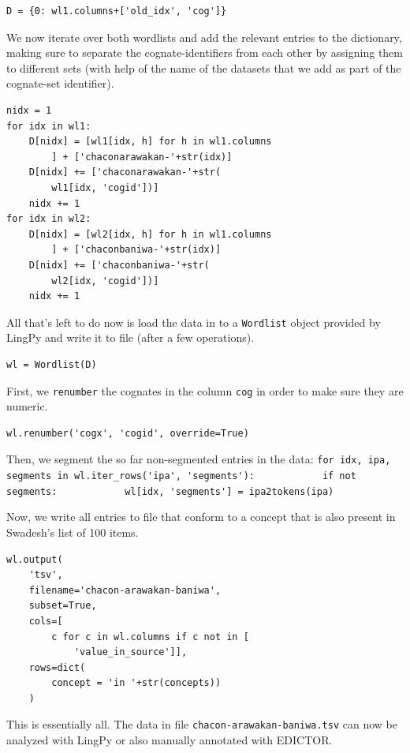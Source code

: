\documentclass[
  a4paper,
  14pt,
  oneside,
  tablecaptionabove
]{scrbook}
\begin{document}
\begin{lstlisting}
D = {0: wl1.columns+['old_idx', 'cog']}
\end{lstlisting}

We now iterate over both wordlists and add the relevant entries to the
dictionary, making sure to separate the cognate-identifiers from each
other by assigning them to different sets (with help of the name of the
datasets that we add as part of the cognate-set identifier).

\begin{lstlisting}
nidx = 1
for idx in wl1:
    D[nidx] = [wl1[idx, h] for h in wl1.columns
        ] + ['chaconarawakan-'+str(idx)]
    D[nidx] += ['chaconarawakan-'+str(
        wl1[idx, 'cogid'])]
    nidx += 1
for idx in wl2:
    D[nidx] = [wl2[idx, h] for h in wl1.columns
        ] + ['chaconbaniwa-'+str(idx)]
    D[nidx] += ['chaconbaniwa-'+str(
        wl2[idx, 'cogid'])]
    nidx += 1
\end{lstlisting}

All that's left to do now is load the data in to a \lstinline!Wordlist!
object provided by LingPy and write it to file (after a few operations).

\begin{lstlisting}
wl = Wordlist(D)
\end{lstlisting}

First, we \lstinline!renumber! the cognates in the column
\lstinline!cog! in order to make sure they are numeric.

\begin{lstlisting}
wl.renumber('cogx', 'cogid', override=True)
\end{lstlisting}

Then, we segment the so far non-segmented entries in the data:
\lstinline!for idx, ipa, segments in wl.iter_rows('ipa', 'segments'):            if not segments:            wl[idx, 'segments'] = ipa2tokens(ipa)!

Now, we write all entries to file that conform to a concept that is also
present in Swadesh's list of 100 items.

\begin{lstlisting}
wl.output(
    'tsv', 
    filename='chacon-arawakan-baniwa', 
    subset=True, 
    cols=[
        c for c in wl.columns if c not in [
            'value_in_source']],
    rows=dict(
        concept = 'in '+str(concepts))
    )
\end{lstlisting}

This is essentially all. The data in file
\lstinline!chacon-arawakan-baniwa.tsv! can now be analyzed with LingPy
or also manually annotated with EDICTOR.
\end{document}
